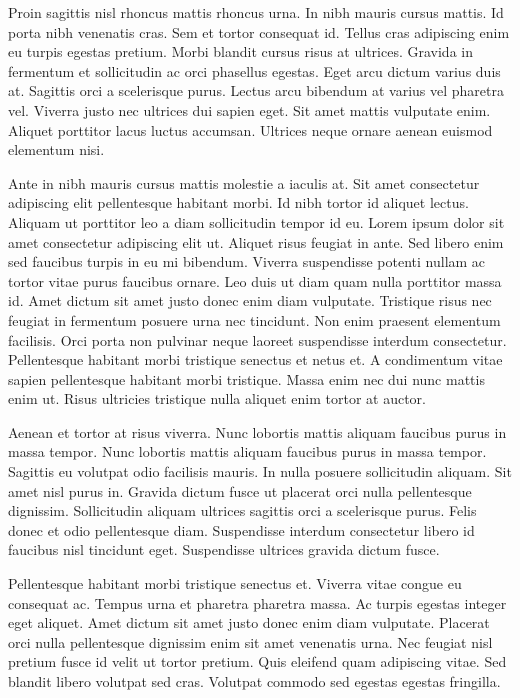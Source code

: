 \documentclass[11pt,a4paper]{article}
\begin{document}
Proin sagittis nisl rhoncus mattis rhoncus urna. In nibh mauris cursus mattis. Id porta nibh venenatis cras. Sem et tortor consequat id. Tellus cras adipiscing enim eu turpis egestas pretium. Morbi blandit cursus risus at ultrices. Gravida in fermentum et sollicitudin ac orci phasellus egestas. Eget arcu dictum varius duis at. Sagittis orci a scelerisque purus. Lectus arcu bibendum at varius vel pharetra vel. Viverra justo nec ultrices dui sapien eget. Sit amet mattis vulputate enim. Aliquet porttitor lacus luctus accumsan. Ultrices neque ornare aenean euismod elementum nisi.

Ante in nibh mauris cursus mattis molestie a iaculis at. Sit amet consectetur adipiscing elit pellentesque habitant morbi. Id nibh tortor id aliquet lectus. Aliquam ut porttitor leo a diam sollicitudin tempor id eu. Lorem ipsum dolor sit amet consectetur adipiscing elit ut. Aliquet risus feugiat in ante. Sed libero enim sed faucibus turpis in eu mi bibendum. Viverra suspendisse potenti nullam ac tortor vitae purus faucibus ornare. Leo duis ut diam quam nulla porttitor massa id. Amet dictum sit amet justo donec enim diam vulputate. Tristique risus nec feugiat in fermentum posuere urna nec tincidunt. Non enim praesent elementum facilisis. Orci porta non pulvinar neque laoreet suspendisse interdum consectetur. Pellentesque habitant morbi tristique senectus et netus et. A condimentum vitae sapien pellentesque habitant morbi tristique. Massa enim nec dui nunc mattis enim ut. Risus ultricies tristique nulla aliquet enim tortor at auctor.

Aenean et tortor at risus viverra. Nunc lobortis mattis aliquam faucibus purus in massa tempor. Nunc lobortis mattis aliquam faucibus purus in massa tempor. Sagittis eu volutpat odio facilisis mauris. In nulla posuere sollicitudin aliquam. Sit amet nisl purus in. Gravida dictum fusce ut placerat orci nulla pellentesque dignissim. Sollicitudin aliquam ultrices sagittis orci a scelerisque purus. Felis donec et odio pellentesque diam. Suspendisse interdum consectetur libero id faucibus nisl tincidunt eget. Suspendisse ultrices gravida dictum fusce.

Pellentesque habitant morbi tristique senectus et. Viverra vitae congue eu consequat ac. Tempus urna et pharetra pharetra massa. Ac turpis egestas integer eget aliquet. Amet dictum sit amet justo donec enim diam vulputate. Placerat orci nulla pellentesque dignissim enim sit amet venenatis urna. Nec feugiat nisl pretium fusce id velit ut tortor pretium. Quis eleifend quam adipiscing vitae. Sed blandit libero volutpat sed cras. Volutpat commodo sed egestas egestas fringilla.
\end{document}
